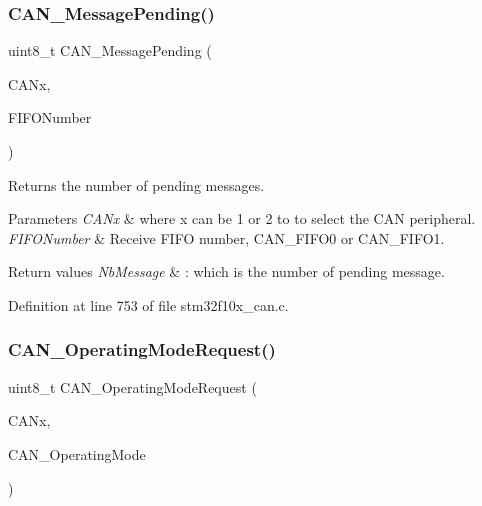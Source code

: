 \subsubsection{\texorpdfstring{C\+A\+N\+\_\+\+Message\+Pending()}{CAN\_MessagePending()}}
{\footnotesize\ttfamily uint8\+\_\+t C\+A\+N\+\_\+\+Message\+Pending (\begin{DoxyParamCaption}\item[{\hyperlink{struct_c_a_n___type_def}{C\+A\+N\+\_\+\+Type\+Def} $\ast$}]{C\+A\+Nx,  }\item[{uint8\+\_\+t}]{F\+I\+F\+O\+Number }\end{DoxyParamCaption})}



Returns the number of pending messages. 


\begin{DoxyParams}{Parameters}
{\em C\+A\+Nx} & where x can be 1 or 2 to to select the C\+AN peripheral. \\
\hline
{\em F\+I\+F\+O\+Number} & Receive F\+I\+FO number, C\+A\+N\+\_\+\+F\+I\+F\+O0 or C\+A\+N\+\_\+\+F\+I\+F\+O1. \\
\hline
\end{DoxyParams}

\begin{DoxyRetVals}{Return values}
{\em Nb\+Message} & \+: which is the number of pending message. \\
\hline
\end{DoxyRetVals}


Definition at line 753 of file stm32f10x\+\_\+can.\+c.

\mbox{\label{group___c_a_n___exported___functions_gab2a3630e9e3024114eb117d14e514208}} 
\subsubsection{\texorpdfstring{C\+A\+N\+\_\+\+Operating\+Mode\+Request()}{CAN\_OperatingModeRequest()}}
{\footnotesize\ttfamily uint8\+\_\+t C\+A\+N\+\_\+\+Operating\+Mode\+Request (\begin{DoxyParamCaption}\item[{\hyperlink{struct_c_a_n___type_def}{C\+A\+N\+\_\+\+Type\+Def} $\ast$}]{C\+A\+Nx,  }\item[{uint8\+\_\+t}]{C\+A\+N\+\_\+\+Operating\+Mode }\end{DoxyParamCaption})}



